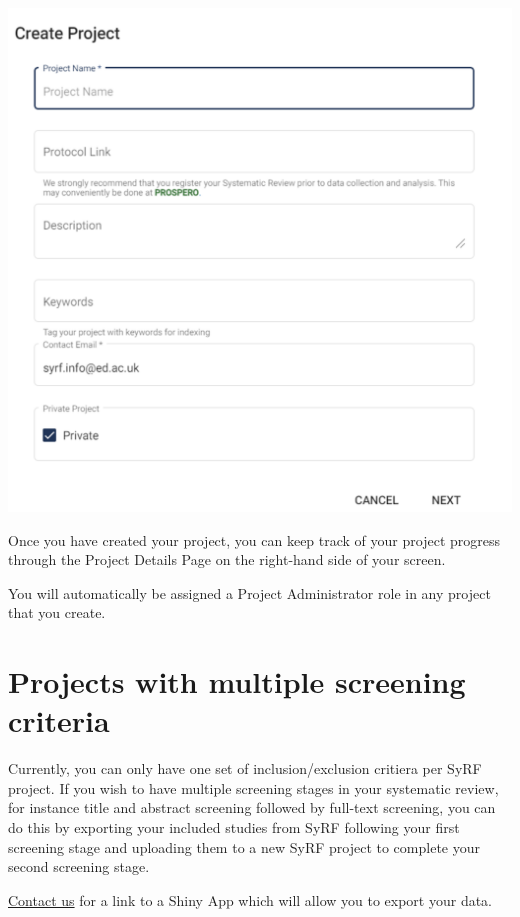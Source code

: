 \documentclass[
]{book}
\begin{document}
\includegraphics[width=14.35in]{figs/Fig_Create_a_project}

Once you have created your project, you can keep track of your project progress through the Project Details Page on the right-hand side of your screen.

You will automatically be assigned a Project Administrator role in any project that you create.

\hypertarget{projects-with-multiple-screening-criteria}{%
\section{Projects with multiple screening criteria}\label{projects-with-multiple-screening-criteria}}

Currently, you can only have one set of inclusion/exclusion critiera per SyRF project. If you wish to have multiple screening stages in your systematic review, for instance title and abstract screening followed by full-text screening, you can do this by exporting your included studies from SyRF following your first screening stage and uploading them to a new SyRF project to complete your second screening stage.

\href{mailto:syrf.info@ed.ac.uk}{Contact us} for a link to a Shiny App which will allow you to export your data.
\end{document}
